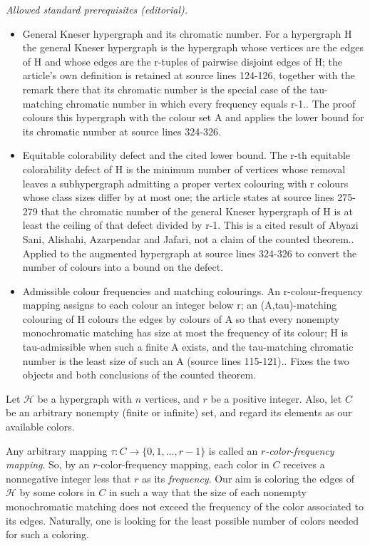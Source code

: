 \documentclass[11pt]{amsart}
\theoremstyle{definition}
\begin{document}
\noindent\textit{Allowed standard prerequisites (editorial).}\begin{itemize}
\item General Kneser hypergraph and its chromatic number. For a hypergraph H the general Kneser hypergraph is the hypergraph whose vertices are the edges of H and whose edges are the r-tuples of pairwise disjoint edges of H; the article's own definition is retained at source lines 124-126, together with the remark there that its chromatic number is the special case of the tau-matching chromatic number in which every frequency equals r-1.. The proof colours this hypergraph with the colour set A and applies the lower bound for its chromatic number at source lines 324-326.
\item Equitable colorability defect and the cited lower bound. The r-th equitable colorability defect of H is the minimum number of vertices whose removal leaves a subhypergraph admitting a proper vertex colouring with r colours whose class sizes differ by at most one; the article states at source lines 275-279 that the chromatic number of the general Kneser hypergraph of H is at least the ceiling of that defect divided by r-1. This is a cited result of Abyazi Sani, Alishahi, Azarpendar and Jafari, not a claim of the counted theorem.. Applied to the augmented hypergraph at source lines 324-326 to convert the number of colours into a bound on the defect.
\item Admissible colour frequencies and matching colourings. An r-colour-frequency mapping assigns to each colour an integer below r; an (A,tau)-matching colouring of H colours the edges by colours of A so that every nonempty monochromatic matching has size at most the frequency of its colour; H is tau-admissible when such a finite A exists, and the tau-matching chromatic number is the least size of such an A (source lines 115-121).. Fixes the two objects and both conclusions of the counted theorem.
\end{itemize}\medskip
Let ${\mathcal H}$ be a hypergraph with $n$ vertices, and $r$ be a positive integer. Also, let $C$ be an arbitrary nonempty (finite or infinite) set, and regard its elements as our available colors.

\noindent Any arbitrary mapping $\tau: C\longrightarrow \{0,1,\ldots,r-1\}$ is called an {\it $r$-color-frequency mapping}. So, by an $r$-color-frequency mapping, each color in $C$ receives a nonnegative integer less that $r$ as its {\it frequency}. Our aim is coloring the edges of ${\mathcal H}$ by some colors in $C$ in such a way that the size of each nonempty monochromatic matching does not exceed the frequency of the color associated to its edges. Naturally, one is looking for the least possible number of colors needed for such a coloring.
\end{document}
